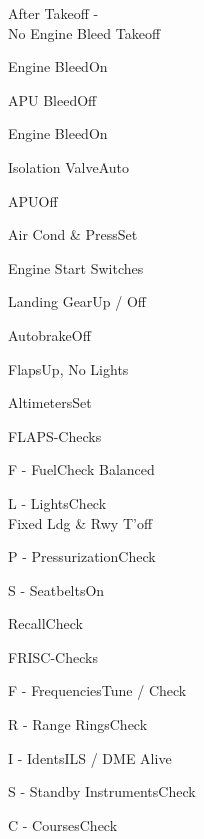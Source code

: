 \documentclass[sim-use, blue_items, halfpage]{checklist}
\begin{document}
\begin{checklist}{After Takeoff -\\No Engine Bleed Takeoff}
  \item{Engine  Bleed}{On}
  \item{APU Bleed}{Off}
  \item{Engine  Bleed}{On}
  \item{Isolation Valve}{Auto}
  \item{APU}{Off}
  \item{Air Cond \& Press}{Set}
  \item{Engine Start Switches}{\blank}
  \item{Landing Gear}{Up / Off}
  \item{Autobrake}{Off}
  \item{Flaps}{Up, No Lights}
  \item{Altimeters}{Set}
\end{checklist}

\clearpage

\begin{checklist}{FLAPS-Checks}
  \item{F - Fuel}{Check Balanced}
  \item{L - Lights}{Check\\Fixed Ldg \& Rwy T'off}
  \item{P - Pressurization}{Check}
  \item{S - Seatbelts}{On}
  \item{Recall}{Check}
\end{checklist}

\begin{checklist}{FRISC-Checks}
  \item{F - Frequencies}{Tune / Check}
  \item{R - Range Rings}{Check}
  \item{I - Idents}{ILS / DME Alive}
  \item{S - Standby Instruments}{Check}
  \item{C - Courses}{Check}
\end{checklist}
\end{document}
